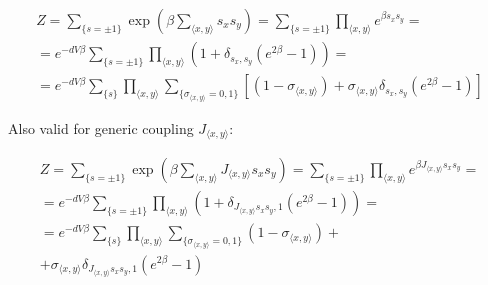 \documentclass[12pt,handout]{beamer}
\begin{document}
\begin{frame}
\begin{center}

\begin{gather*}
Z = \sum_{\lbrace s = \pm 1\rbrace} \exp \left( \beta \sum_{\langle x, y \rangle} s_x s_y \right) = \sum_{\lbrace s = \pm 1 \rbrace} \prod_{\langle x, y \rangle} e^{ \beta  s_x s_y} = \\[20pt]
= e ^{ -d V \beta } \sum_{\lbrace s = \pm 1 \rbrace} \prod_{\langle x, y \rangle} \left( 1 + \delta_{s_x, s_y} \left( e^{  2 \beta} - 1 \right) \right) = \\[20pt]
= e^{ -d V \beta} \sum_{\lbrace s \rbrace} \prod_{\langle x, y \rangle}   \sum_{\lbrace \sigma_{\langle x, y \rangle} = 0,1 \rbrace} \left[ \left( 1 - \sigma_{\langle x, y \rangle} \right)
+ \sigma_{\langle x, y \rangle} \delta_{s_x, s_y} \left( e^{ 2 \beta } - 1 \right) \right]
\end{gather*}

\end{center}
\end{frame}

\begin{frame}
\begin{center}

Also valid for generic coupling $J_{\langle x, y \rangle}$:

\begin{gather*}
Z = \sum_{\lbrace s = \pm 1\rbrace} \exp \left( \beta \sum_{\langle x, y \rangle} J_{\langle x, y \rangle} s_x s_y \right) = \sum_{\lbrace s = \pm 1 \rbrace} \prod_{\langle x, y \rangle} e^{ \beta  J_{\langle x, y \rangle} s_x s_y} = \\[20pt]
= e ^{ -d V \beta } \sum_{\lbrace s = \pm 1 \rbrace} \prod_{\langle x, y \rangle} \left( 1 + \delta_{J_{\langle x, y \rangle} s_x s_y, 1} \left( e^{  2 \beta} - 1 \right) \right) = \\[20pt]
= e^{ -d V \beta} \sum_{\lbrace s \rbrace} \prod_{\langle x, y \rangle}   \sum_{\lbrace \sigma_{\langle x, y \rangle} = 0,1 \rbrace}  \left( 1 - \sigma_{\langle x, y \rangle} \right) + \\
+ \sigma_{\langle x, y \rangle} \delta_{J_{\langle x, y \rangle} s_x s_y, 1} \left( e^{ 2 \beta } - 1 \right) 
\end{gather*}

\end{center}
\end{frame}
\end{document}

